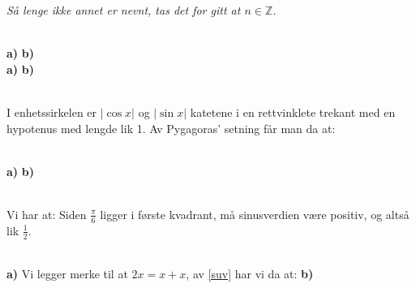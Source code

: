





\textit{Så lenge ikke annet er nevnt, tas det for gitt at $ n\in \mathbb{Z} $.} \vsk

\\
\textbf{a)}
\textbf{b)}
\\
\textbf{a)}
\textbf{b)}

\\
I enhetssirkelen er $ |\cos x| $ og $ |\sin x| $ katetene i en rettvinklete trekant med en hypotenus med lengde lik 1. Av Pygagoras' setning får man da at:

\\
\textbf{a)} 
\newpage
\textbf{b)} 


\\
Vi har at:
Siden $ \frac{\pi}{6} $ ligger i første kvadrant, må sinusverdien være positiv, og altså lik $ \frac{1}{2} $.\vsk

\\
\textbf{a)} Vi legger merke til at $ {2x=x+x} $, av \eqref{suv} har vi da at:
\textbf{b)} 

